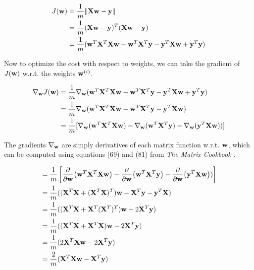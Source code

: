 \documentclass[11pt]{article}
\begin{document}
\begin{enumerate}[start=1,label={\bfseries Question \arabic*:},leftmargin=1in]
        \begin{align}
            J(\vb{w}) &= \frac{1}{m} \norm{ \vb{Xw} - \vb{y}  } \\
                      &= \frac{1}{m} (\vb{Xw} - \vb{y})^T(\vb{Xw} - \vb{y}) \\
                      &= \frac{1}{m} ( \vb{w}^T\vb{X}^T\vb{Xw} - \vb{w}^T\vb{X}^T\vb{y} - \vb{y}^T \vb{Xw} + \vb{y}^T\vb{y} )
        \end{align}

        Now to optimize the cost with respect to weights, we can take the gradient of \(J(\vb{w})\) w.r.t. the weights \(\vb{w}^{(i)}\).

        \begin{align}
            \nabla_{\vb{w}} J(\vb{w}) &= \frac{1}{m} \nabla_{\vb{w}} (  \vb{w}^T\vb{X}^T\vb{Xw} - \vb{w}^T\vb{X}^T\vb{y} - \vb{y}^T \vb{Xw} + \vb{y}^T\vb{y} ) \\
                                      &= \frac{1}{m} \nabla_{\vb{w}} (  \vb{w}^T\vb{X}^T\vb{Xw} - \vb{w}^T\vb{X}^T\vb{y} - \vb{y}^T \vb{Xw}  ) \\
                                      &= \frac{1}{m} [ \nabla_{\vb{w}} (  \vb{w}^T\vb{X}^T\vb{Xw } ) - \nabla_{\vb{w}} ( \vb{w}^T\vb{X}^T\vb{y} ) - \nabla_{\vb{w}} ( \vb{y}^T \vb{Xw}  ) ) ]
        \end{align}

        The gradients \(\nabla_{\vb{w}}\) are simply derivatives of each matrix function w.r.t. \(\vb{w}\), which can be computed using equations (69) and (81) from \emph{The Matrix Cookbook} \cite{matrixcookbook}.

        \begin{align}
            &= \frac{1}{m} \left[ \pdv{\vb{w}} (  \vb{w}^T\vb{X}^T\vb{Xw } ) - \pdv{\vb{w}} ( \vb{w}^T\vb{X}^T\vb{y} ) - \pdv{\vb{w}} ( \vb{y}^T \vb{Xw}  ) ) \right] \\
            &= \frac{1}{m} ( (\vb{X}^T\vb{X} + ( \vb{X}^T\vb{X} )^T )\vb{w} - \vb{X}^T\vb{y} - \vb{y}^T\vb{X} ) \\
            &= \frac{1}{m} ( (\vb{X}^T\vb{X} + \vb{X}^T ( \vb{X}^T )^T )\vb{w} - 2\vb{X}^T\vb{y} ) \\
            &= \frac{1}{m} ( (\vb{X}^T\vb{X} + \vb{X}^T\vb{X})\vb{w} - 2\vb{X}^T\vb{y} ) \\
            &= \frac{1}{m} (2\vb{X}^T\vb{X}\vb{w} - 2\vb{X}^T\vb{y} ) \\
            &= \frac{2}{m} (\vb{X}^T\vb{X}\vb{w} - \vb{X}^T\vb{y} )
        \end{align}


\end{enumerate}
\end{document}

